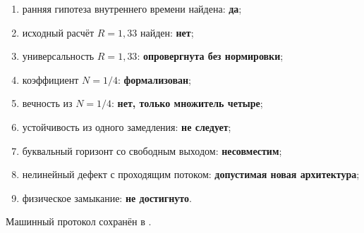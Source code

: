 \begin{protocol}
\begin{enumerate}
 \item ранняя гипотеза внутреннего времени найдена: \textbf{да};
 \item исходный расчёт $R=1{,}33$ найден: \textbf{нет};
 \item универсальность $R=1{,}33$: \textbf{опровергнута без нормировки};
 \item коэффициент $N=1/4$: \textbf{формализован};
 \item вечность из $N=1/4$: \textbf{нет, только множитель четыре};
 \item устойчивость из одного замедления: \textbf{не следует};
 \item буквальный горизонт со свободным выходом: \textbf{несовместим};
 \item нелинейный дефект с проходящим потоком: \textbf{допустимая новая
 архитектура};
 \item физическое замыкание: \textbf{не достигнуто}.
\end{enumerate}
\end{protocol}

Машинный протокол сохранён в
.